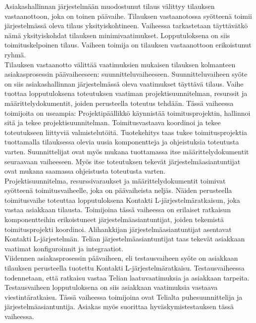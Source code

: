 \documentclass[finnish,12pt,a4paper,pdftex]{article}
\begin{document}
Asiakashallinnan järjestelmään muodostunut tilaus välittyy tilauksen vastaanottoon, joka on toinen päävaihe. Tilauksen vastaanotossa syötteenä toimii järjestelmässä oleva tilaus yksityiskohtineen. Vaiheessa tarkastetaan täyttävätkö nämä yksityiskohdat tilauksen minimivaatimukset. Lopputuloksena on siis toimituskelpoinen tilaus. Vaiheen toimija on tilauksen vastaanottoon erikoistunut ryhmä.\\

Tilauksen vastaanotto välittää vaatimuksien mukaisen tilauksen kolmanteen asiakasprosessin päävaiheeseen: suunnitteluvaiheeseen. Suunnitteluvaiheen syöte on siis asiakashallinnan järjestelmässä oleva vaatimukset täyttävä tilaus. Vaihe tuottaa lopputuloksena toteutuksen vaatiman projektisuunnitelman, resurssit ja määrittelydokumentit, joiden perusteella toteutus tehdään. Tässä vaiheessa toimijoita on useampia: Projektipäällikkö käynnistää toimitusprojektin, hallinnoi sitä ja tekee projektisuunnitelman. Toimitusvastaava koordinoi ja tekee toteutukseen liittyviä valmistelutöitä. Tuotekehitys taas tukee toimitusprojektia tuottamalla tilauksessa olevia uusia komponentteja ja ohjeistuksia toteutusta varten. Suunnittelijat ovat myös mukana tuottamassa itse määrittelydokumentit seuraavaan vaiheeseen. Myös itse toteutuksen tekevät järjestelmäasiantuntijat ovat mukana saamassa ohjeistusta toteutusta varten.\\

Projektisuunnitelma, resurssivaraukset ja määrittelydokumentit toimivat syötteenä toimitusvaiheelle, joka on päävaiheista neljäs. Näiden perusteella toimitusvaihe toteuttaa lopputuloksena Kontakti L-järjestelmäratkaisun, joka vastaa asiakkaan tilausta. Toimijoina tässä vaiheessa on erilaiset ratkaisun komponentteihin erikoistuneet järjestelmäasiantuntijat, joiden tekemistä toimitusprojekti koordinoi. Alihankkijan järjestelmäasiantuntijat asentavat Kontakti L-järjestelmän. Telian järjestelmäasiantuntijat taas tekevät asiakkaan vaatimat konfiguroinnit ja integraatiot. \\

Viidennen asiakasprosessin päävaiheen, eli testausvaiheen syöte on asiakkaan tilauksen perusteella tuotettu Kontakti L-järjestelmäratkaisu. Testausvaiheessa todennetaan, että ratkaisu vastaa Telian laatuvaatimuksia ja asiakkaan tarpeita. Testausvaiheen lopputuloksena on siis asiakkaan vaatimuksia vastaava viestintäratkaisu. Tässä vaiheessa toimijoina ovat Telialta puhesuunnittelija ja järjestelmäasiantuntija. Asiakas myös suorittaa hyväskymistestauksen tässä vaiheessa.\\
\end{document}
